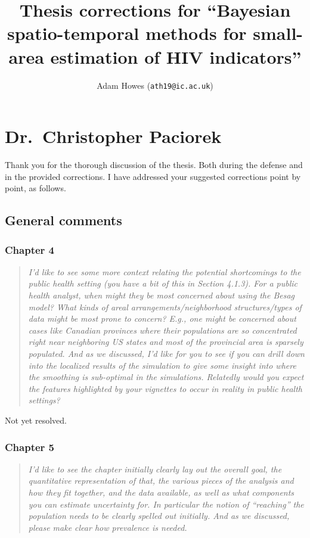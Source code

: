 \documentclass[
  12pt,
]{article}
\title{Thesis corrections for ``Bayesian spatio-temporal methods for
small-area estimation of HIV indicators''}
\subtitle{Adam Howes (\texttt{ath19@ic.ac.uk})}
\author{}
\date{\vspace{-2.5em}}
\begin{document}
\maketitle

{
\setcounter{tocdepth}{2}
\tableofcontents
}
\newpage

\section{Dr.~Christopher Paciorek}\label{dr.-christopher-paciorek}

Thank you for the thorough discussion of the thesis. Both during the
defense and in the provided corrections. I have addressed your suggested
corrections point by point, as follows.

\subsection{General comments}\label{general-comments}

\subsubsection{Chapter 4}\label{chapter-4}

\begin{quote}
\emph{I'd like to see some more context relating the potential
shortcomings to the public health setting (you have a bit of this in
Section 4.1.3). For a public health analyst, when might they be most
concerned about using the Besag model? What kinds of areal
arrangements/neighborhood structures/types of data might be most prone
to concern? E.g., one might be concerned about cases like Canadian
provinces where their populations are so concentrated right near
neighboring US states and most of the provincial area is sparsely
populated. And as we discussed, I'd like for you to see if you can drill
down into the localized results of the simulation to give some insight
into where the smoothing is sub-optimal in the simulations. Relatedly
would you expect the features highlighted by your vignettes to occur in
reality in public health settings?}
\end{quote}

Not yet resolved.

\subsubsection{Chapter 5}\label{chapter-5}

\begin{quote}
\emph{I'd like to see the chapter initially clearly lay out the overall
goal, the quantitative representation of that, the various pieces of the
analysis and how they fit together, and the data available, as well as
what components you can estimate uncertainty for. In particular the
notion of ``reaching'' the population needs to be clearly spelled out
initially. And as we discussed, please make clear how prevalence is
needed.}
\end{quote}
\end{document}
